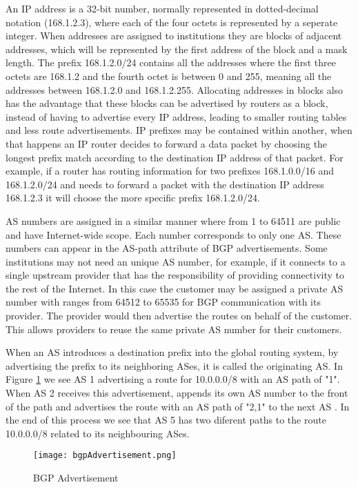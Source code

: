 \documentclass[11pt,a4paper]{scrreprt}
\begin{document}
	An IP address is a 32-bit number, normally represented in dotted-decimal notation (168.1.2.3), where each of the four octets is represented by a seperate integer. When addresses are assigned to institutions they are blocks of adjacent addresses, which will be represented by the first address of the block and a mask length. The prefix 168.1.2.0/24 contains all the addresses where the first three octets are 168.1.2 and the fourth octet is between 0 and 255, meaning all the addresses between 168.1.2.0 and 168.1.2.255. Allocating addresses in blocks also has the advantage that these blocks can be advertised by routers as a block, instead of having to advertise every IP address, leading to smaller routing tables and less route advertisements. IP prefixes may be contained within another, when that happens an IP router decides to forward a data packet by choosing the longest prefix match according to the destination IP address of that packet. For example, if a router has routing information for two prefixes 168.1.0.0/16 and 168.1.2.0/24 and needs to forward a packet with the destination IP address 168.1.2.3 it will choose the more specific prefix 168.1.2.0/24. 

AS numbers are assigned in a similar manner where from 1 to 64511 are public and have Internet-wide scope. Each number corresponds to only one AS. These numbers can appear in the AS-path attribute of BGP advertisements. Some institutions may not need an unique AS number, for example, if it connects to a single upstream provider that has the responsibility of providing connectivity to the rest of the Internet. In this case the customer may be assigned a private AS number with ranges from 64512 to 65535 for BGP communication with its provider. The provider would then advertise the routes on behalf of the customer. This allows providers to reuse the same private AS number for their customers.

When an AS introduces a destination prefix into the global routing system, by advertising the prefix to its neighboring ASes, it is called the originating AS. In Figure \ref{fig:bgpAdvertisement} we see AS 1 advertising a route for 10.0.0.0/8 with an AS path of "1". When AS 2 receives this advertisement, appends its own AS number to the front of the path and advertises the route with an AS path of "2,1" to the next AS . In the end of this process we see that AS 5 has two diferent paths to the route 10.0.0.0/8 related to its neighbouring ASes.

\begin{figure}[h!]
\centering
\texttt{[image: bgpAdvertisement.png]}
\caption{BGP Advertisement}
\label{fig:bgpAdvertisement}
\end{figure}
\end{document}
